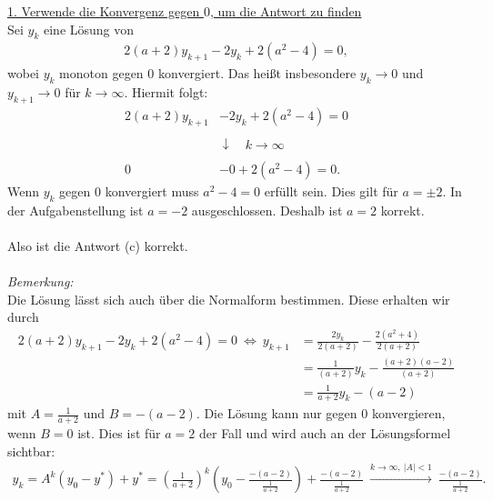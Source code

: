 \underline{1. Verwende die Konvergenz gegen $ 0 $, um die Antwort zu finden}\\
Sei $ y_k $ eine Lösung von
\begin{align*}
2 (a + 2) y_{k+1} - 2 y_k + 2 (a^2 - 4) = 0,
\end{align*}
wobei $ y_k $ monoton gegen $ 0 $ konvergiert.
Das heißt insbesondere $ y_k \to 0  $ und $ y_{k+1} \to 0 $ für $ k \to \infty $.
Hiermit folgt:
\begin{align*}
2 (a + 2) y_{k+1} &- 2 y_k + 2 (a^2 - 4) = 0\\
&\quad\\
&\downarrow \quad k \to \infty\\
&\quad\\
0 &- 0  + 2(a^2 -4) = 0.
\end{align*}
Wenn $ y_k  $ gegen $ 0 $ konvergiert muss $ a^2 - 4 = 0 $ erfüllt sein.
Dies gilt für $ a = \pm 2 $. In der Aufgabenstellung ist $ a = -2 $ ausgeschlossen. Deshalb ist $ a = 2 $ korrekt.\\
\\
Also ist die Antwort (c) korrekt.\\
\\
\textit{Bemerkung:}\\
Die Lösung lässt sich auch über die Normalform bestimmen.
Diese erhalten wir durch
\begin{align*}
2 (a + 2) y_{k+1} - 2 y_k + 2 (a^2 - 4) = 0
\ \Leftrightarrow \
y_{k+1} &= \frac{2 y_k}{2(a+2)} - \frac{2 (a^2 + 4)}{2(a+2)}\\
&=
\frac{1}{(a+2)} y_k - \frac{(a +2)(a-2)}{(a+2)}\\
&=
\frac{1}{a+2} y_k - (a-2)
\end{align*}
mit $ A = \frac{1}{a+2} $ und $ B = -(a-2) $.
Die Lösung kann nur gegen $ 0 $ konvergieren, wenn $ B = 0 $ ist.
Dies ist für $ a= 2 $ der Fall und wird auch an der Lösungsformel sichtbar:
\begin{align*}
y_k = A^k (y_0 - y^\ast) + y^\ast
= \left(\frac{1}{a+2}\right)^k \left(y_0 - \frac{-(a-2)}{\frac{1}{a+2}}\right) + \frac{-(a-2)}{\frac{1}{a+2}}
\ \overset{k \to \infty, \ | A | < 1 }{\rightarrow} \ \frac{-(a-2)}{\frac{1}{a+2}}.
\end{align*}
